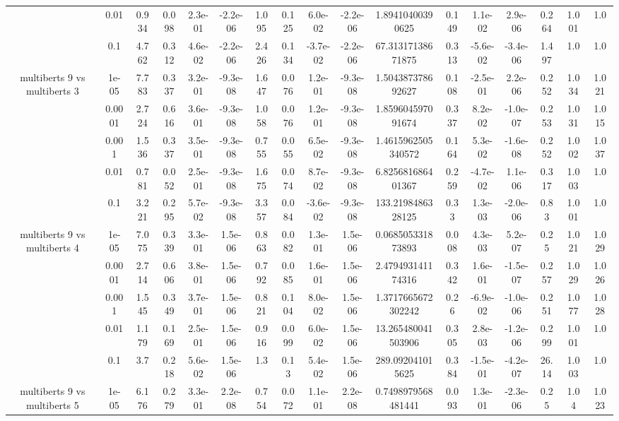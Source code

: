 \begin{tabular}{|c|c|c|c|c|c|c|c|c|c|c|c|c|c|c|c|c|}
 & 0.01 & 0.934 & 0.098 & 2.3e-01 & -2.2e-06 & 1.095 & 0.125 & 6.0e-02 & -2.2e-06 & 1.89410400390625 & 0.149 & 1.1e-02 & 2.9e-06 & 0.264 & 1.001 & 1.0 \\
 & 0.1 & 4.762 & 0.312 & 4.6e-02 & -2.2e-06 & 2.426 & 0.134 & -3.7e-02 & -2.2e-06 & 67.31317138671875 & 0.313 & -5.6e-02 & -3.4e-06 & 1.497 & 1.0 & 1.0 \\
\hline
\multirow{5}{*}{multiberts 9 vs multiberts 3} & 1e-05 & 7.783 & 0.337 & 3.2e-01 & -9.3e-08 & 1.647 & 0.076 & 1.2e-01 & -9.3e-08 & 1.504387378692627 & 0.108 & -2.5e-01 & 2.2e-06 & 0.252 & 1.034 & 1.021 \\
 & 0.0001 & 2.724 & 0.616 & 3.6e-01 & -9.3e-08 & 1.058 & 0.076 & 1.2e-01 & -9.3e-08 & 1.859604597091674 & 0.337 & 8.2e-02 & -1.0e-07 & 0.253 & 1.031 & 1.015 \\
 & 0.001 & 1.536 & 0.337 & 3.5e-01 & -9.3e-08 & 0.755 & 0.055 & 6.5e-02 & -9.3e-08 & 1.4615962505340572 & 0.164 & 5.3e-02 & -1.6e-08 & 0.252 & 1.002 & 1.037 \\
 & 0.01 & 0.781 & 0.052 & 2.5e-01 & -9.3e-08 & 1.675 & 0.074 & 8.7e-02 & -9.3e-08 & 6.825681686401367 & 0.259 & -4.7e-02 & 1.1e-06 & 0.317 & 1.003 & 1.0 \\
 & 0.1 & 3.221 & 0.295 & 5.7e-02 & -9.3e-08 & 3.357 & 0.084 & -3.6e-02 & -9.3e-08 & 133.2198486328125 & 0.33 & 1.3e-03 & -2.0e-06 & 0.83 & 1.001 & 1.0 \\
\hline
\multirow{5}{*}{multiberts 9 vs multiberts 4} & 1e-05 & 7.075 & 0.339 & 3.3e-01 & 1.5e-06 & 0.863 & 0.082 & 1.3e-01 & 1.5e-06 & 0.068505331873893 & 0.008 & 4.3e-03 & 5.2e-07 & 0.25 & 1.021 & 1.029 \\
 & 0.0001 & 2.714 & 0.606 & 3.8e-01 & 1.5e-06 & 0.792 & 0.085 & 1.6e-01 & 1.5e-06 & 2.479493141174316 & 0.342 & 1.6e-01 & -1.5e-07 & 0.257 & 1.029 & 1.026 \\
 & 0.001 & 1.545 & 0.349 & 3.7e-01 & 1.5e-06 & 0.821 & 0.104 & 8.0e-02 & 1.5e-06 & 1.3717665672302242 & 0.26 & -6.9e-02 & -1.0e-06 & 0.251 & 1.077 & 1.028 \\
 & 0.01 & 1.179 & 0.169 & 2.5e-01 & 1.5e-06 & 0.916 & 0.099 & 6.0e-02 & 1.5e-06 & 13.265480041503906 & 0.305 & 2.8e-03 & -1.2e-06 & 0.299 & 1.001 & 1.0 \\
 & 0.1 & 3.7 & 0.218 & 5.6e-02 & 1.5e-06 & 1.3 & 0.13 & 5.4e-02 & 1.5e-06 & 289.092041015625 & 0.384 & -1.5e-01 & -4.2e-07 & 26.14 & 1.003 & 1.0 \\
\hline
\multirow{5}{*}{multiberts 9 vs multiberts 5} & 1e-05 & 6.176 & 0.279 & 3.3e-01 & 2.2e-08 & 0.754 & 0.072 & 1.1e-01 & 2.2e-08 & 0.7498979568481441 & 0.093 & 1.3e-01 & -2.3e-06 & 0.25 & 1.04 & 1.023 \\

\end{tabular}
